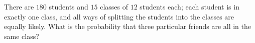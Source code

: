 There are $180$ students and $15$ classes of $12$ students each; each student is in exactly one class, and all ways of splitting the students into the classes are equally likely. What is the probability that three particular friends are all in the same class?
